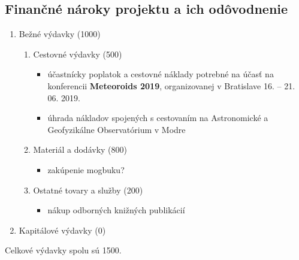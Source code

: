 \subsection{Finančné nároky projektu a ich
odôvodnenie}\label{finanux10dnuxe9-nuxe1roky-projektu-a-ich-oduxf4vodnenie}

\begin{enumerate}
\def\labelenumi{\arabic{enumi}.}
\tightlist
\item
  Bežné výdavky (\SI{1000}{\eur})

  \begin{enumerate}
  \def\labelenumii{\alph{enumii}.}
  \tightlist
  \item
    Cestovné výdavky (\SI{500}{\eur})

    \begin{itemize}
    \tightlist
    \item
      účastnícky poplatok a cestovné náklady potrebné na účasť na
      konferencii \textbf{Meteoroids 2019}, organizovanej v Bratislave
      16. -- 21. 06. 2019.
    \item
      úhrada nákladov spojených s cestovaním na Astronomické a
      Geofyzikálne Observatórium v Modre
    \end{itemize}
  \item
    Materiál a dodávky (\SI{800}{\eur})

    \begin{itemize}
    \tightlist
    \item
      zakúpenie mogbuku?
    \end{itemize}
  \item
    Ostatné tovary a služby (\SI{200}{\eur})

    \begin{itemize}
    \tightlist
    \item
      nákup odborných knižných publikácií
    \end{itemize}
  \end{enumerate}
\item
  Kapitálové výdavky (\SI{0}{\eur})
\end{enumerate}

Celkové výdavky spolu sú \SI{1500}{\eur}.
